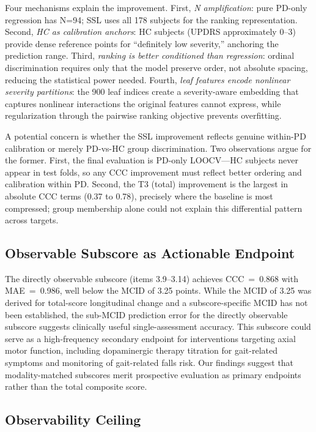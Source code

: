 \documentclass[11pt]{article}
\begin{document}
Four mechanisms explain the improvement. First, \emph{N amplification}: pure PD-only regression has N=94; SSL uses all 178 subjects for the ranking representation. Second, \emph{HC as calibration anchors}: HC subjects (UPDRS approximately 0--3) provide dense reference points for ``definitely low severity,'' anchoring the prediction range. Third, \emph{ranking is better conditioned than regression}: ordinal discrimination requires only that the model preserve order, not absolute spacing, reducing the statistical power needed. Fourth, \emph{leaf features encode nonlinear severity partitions}: the 900 leaf indices create a severity-aware embedding that captures nonlinear interactions the original features cannot express, while regularization through the pairwise ranking objective prevents overfitting.

A potential concern is whether the SSL improvement reflects genuine within-PD calibration or merely PD-vs-HC group discrimination. Two observations argue for the former. First, the final evaluation is PD-only LOOCV---HC subjects never appear in test folds, so any CCC improvement must reflect better ordering and calibration within PD. Second, the T3 (total) improvement is the largest in absolute CCC terms (0.37 to 0.78), precisely where the baseline is most compressed; group membership alone could not explain this differential pattern across targets.

\subsection{Observable Subscore as Actionable Endpoint}

The directly observable subscore (items 3.9--3.14) achieves CCC~=~0.868 with MAE~=~0.986, well below the MCID of 3.25 points. While the MCID of 3.25 was derived for total-score longitudinal change\cite{horvath2015} and a subscore-specific MCID has not been established, the sub-MCID prediction error for the directly observable subscore suggests clinically useful single-assessment accuracy. This subscore could serve as a high-frequency secondary endpoint for interventions targeting axial motor function, including dopaminergic therapy titration for gait-related symptoms and monitoring of gait-related falls risk. Our findings suggest that modality-matched subscores merit prospective evaluation as primary endpoints rather than the total composite score.

\subsection{Observability Ceiling}
\end{document}
